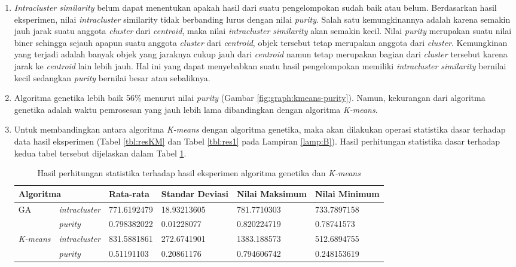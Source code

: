 \begin{enumerate}
	\item \textit{Intracluster similarity} belum dapat menentukan apakah hasil dari suatu pengelompokan sudah baik atau belum. Berdasarkan hasil eksperimen, nilai \textit{intracluster} similarity tidak berbanding lurus dengan nilai \textit{purity}. Salah satu kemungkinannya adalah karena semakin jauh jarak suatu anggota \textit{cluster} dari \textit{centroid}, maka nilai \textit{intracluster similarity} akan semakin kecil. Nilai \textit{purity} merupakan suatu nilai biner sehingga sejauh apapun suatu anggota \textit{cluster} dari \textit{centroid}, objek tersebut tetap merupakan anggota dari \textit{cluster}. Kemungkinan yang terjadi adalah banyak objek yang jaraknya cukup jauh dari \textit{centroid} namun tetap merupakan bagian dari \textit{cluster} tersebut karena jarak ke \textit{centroid} lain lebih jauh. Hal ini yang dapat menyebabkan suatu hasil pengelompokan memiliki \textit{intracluster similarity} bernilai kecil sedangkan \textit{purity} bernilai besar atau sebaliknya.
	\item Algoritma genetika lebih baik 56\% menurut nilai \textit{purity} (Gambar \ref{fig:graph:kmeans-purity}). Namun, kekurangan dari algoritma genetika adalah waktu pemrosesan yang jauh lebih lama dibandingkan dengan algoritma \textit{K-means}. 
	
	\item Untuk membandingkan antara algoritma \textit{K-means} dengan algoritma genetika, maka akan dilakukan operasi statistika dasar terhadap data hasil eksperimen (Tabel \ref{tbl:resKM} dan Tabel \ref{tbl:res1} pada Lampiran \ref{lamp:B}). Hasil perhitungan statistika dasar terhadap kedua tabel tersebut dijelaskan dalam Tabel \ref{tbl:stat-res}.
	
\begin{table}[H]
\caption{Hasil perhitungan statistika terhadap hasil eksperimen algoritma genetika dan \textit{K-means}}
\begin{tabular}{|l|l|l|l|l|l|}
\hline
\multicolumn{2}{|l|}{Algoritma}         & Rata-rata   & Standar Deviasi & Nilai Maksimum & Nilai Minimum \\ \hline
\multirow{2}{*}{GA}      & \textit{intracluster} & 771.6192479 & 18.93213605     & 781.7710303    & 733.7897158   \\ \cline{2-6} 
                         & \textit{purity}       & 0.798382022 & 0.01228077      & 0.820224719    & 0.78741573    \\ \hline
\multirow{2}{*}{\textit{K-means}} & \textit{intracluster} & 831.5881861 & 272.6741901     & 1383.188573    & 512.6894755   \\ \cline{2-6} 
                         & \textit{purity}       & 0.51191103  & 0.20861176      & 0.794606742    & 0.248153619   \\ \hline
\end{tabular}
\label{tbl:stat-res}
\end{table}
	

\end{enumerate}
